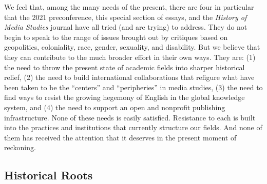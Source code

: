 \documentclass{tufte-handout}
\begin{document}
We feel that, among the many needs of the present, there are four in
particular that the 2021 preconference, this special section of essays,
and the \emph{History of Media Studies} journal have all tried (and are
trying) to address. They do not begin to speak to the range of issues
brought out by critiques based on geopolitics, coloniality, race,
gender, sexuality, and disability. But we believe that they can
contribute to the much broader effort in their own ways. They are: (1)
the need to throw the present state of academic fields into sharper
historical relief, (2) the need to build international collaborations
that refigure what have been taken to be the ``centers'' and
``peripheries'' in media studies, (3) the need to find ways to resist
the growing hegemony of English in the global knowledge system, and (4)
the need to support an open and nonprofit publishing infrastructure.
None of these needs is easily satisfied. Resistance to each is built
into the practices and institutions that currently structure our fields.
And none of them has received the attention that it deserves in the
present moment of reckoning.

\hypertarget{historical-roots}{%
\subsection{Historical
Roots}\label{historical-roots}}
\end{document}
